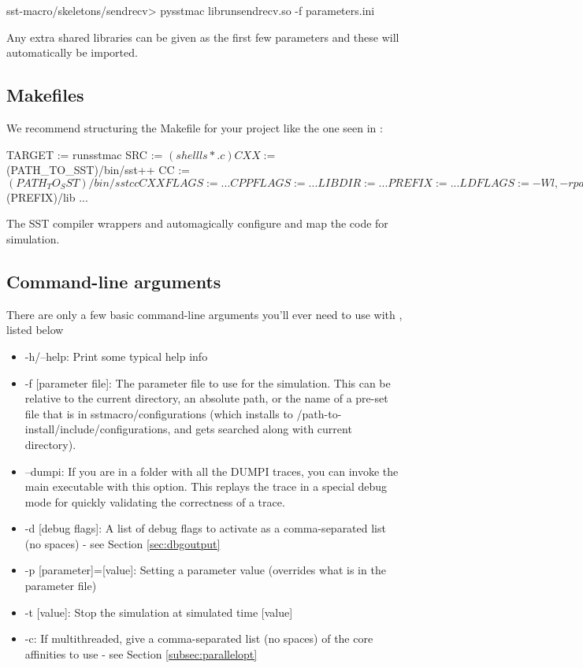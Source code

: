 \begin{ShellCmd}
sst-macro/skeletons/sendrecv> pysstmac librunsendrecv.so -f parameters.ini
\end{ShellCmd}
Any extra shared libraries can be given as the first few parameters and these will automatically be imported.

\subsection{Makefiles}
\label{subsec:tutorial:makefiles}

We recommend structuring the Makefile for your project like the one seen in  :

\begin{ViFile}
TARGET := runsstmac
SRC := $(shell ls *.c) 

CXX :=      $(PATH_TO_SST)/bin/sst++
CC :=        $(PATH_TO_SST)/bin/sstcc
CXXFLAGS := ...
CPPFLAGS := ...
LIBDIR :=  ...
PREFIX :=   ...
LDFLAGS :=  -Wl,-rpath,$(PREFIX)/lib
...
\end{ViFile}
The SST compiler wrappers  and  automagically configure and map the code for simulation. 

\subsection{Command-line arguments}
\label{subsec:tutorial:cmdline}

There are only a few basic command-line arguments you'll ever need to use with \sstmacro, listed below

\begin{itemize}
\item -h/--help: Print some typical help info
\item -f [parameter file]: The parameter file to use for the simulation.  
This can be relative to the current directory, an absolute path, or the name of a pre-set file that is in sstmacro/configurations 
(which installs to /path-to-install/include/configurations, and gets searched along with current directory). 
\item --dumpi: If you are in a folder with all the DUMPI traces, you can invoke the main  executable with this option.  This replays the trace in a special debug mode for quickly validating the correctness of a trace.
\item -d [debug flags]: A list of debug flags to activate as a comma-separated list (no spaces) - see Section \ref{sec:dbgoutput}
\item -p [parameter]=[value]: Setting a parameter value (overrides what is in the parameter file)
\item -t [value]: Stop the simulation at simulated time [value]
\item -c: If multithreaded, give a comma-separated list (no spaces) of the core affinities to use - see Section \ref{subsec:parallelopt}
\end{itemize}

